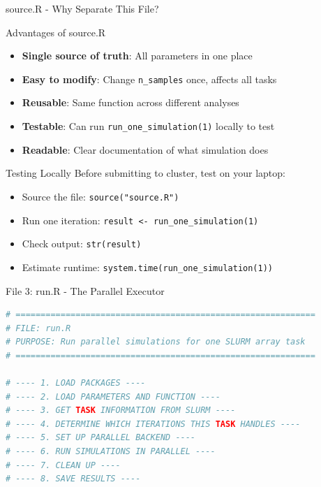 \documentclass[aspectratio=169]{beamer}
\begin{document}
\begin{frame}{source.R - Why Separate This File?}
\begin{block}{Advantages of source.R}
\begin{itemize}
    \item \textbf{Single source of truth}: All parameters in one place
    \item \textbf{Easy to modify}: Change \texttt{n\_samples} once, affects all tasks
    \item \textbf{Reusable}: Same function across different analyses
    \item \textbf{Testable}: Can run \texttt{run\_one\_simulation(1)} locally to test
    \item \textbf{Readable}: Clear documentation of what simulation does
\end{itemize}
\end{block}

\begin{exampleblock}{Testing Locally}
Before submitting to cluster, test on your laptop:
\begin{itemize}
    \item Source the file: \texttt{source("source.R")}
    \item Run one iteration: \texttt{result <- run\_one\_simulation(1)}
    \item Check output: \texttt{str(result)}
    \item Estimate runtime: \texttt{system.time(run\_one\_simulation(1))}
\end{itemize}
\end{exampleblock}
\end{frame}

\begin{frame}[fragile]{File 3: run.R - The Parallel Executor}

\begin{lstlisting}[language=R, basicstyle=\ttfamily\scriptsize]
# ============================================================
# FILE: run.R
# PURPOSE: Run parallel simulations for one SLURM array task
# ============================================================

# ---- 1. LOAD PACKAGES ----
# ---- 2. LOAD PARAMETERS AND FUNCTION ----
# ---- 3. GET TASK INFORMATION FROM SLURM ----
# ---- 4. DETERMINE WHICH ITERATIONS THIS TASK HANDLES ----
# ---- 5. SET UP PARALLEL BACKEND ----
# ---- 6. RUN SIMULATIONS IN PARALLEL ----
# ---- 7. CLEAN UP ----
# ---- 8. SAVE RESULTS ----

\end{lstlisting}
\end{frame}
\end{document}
